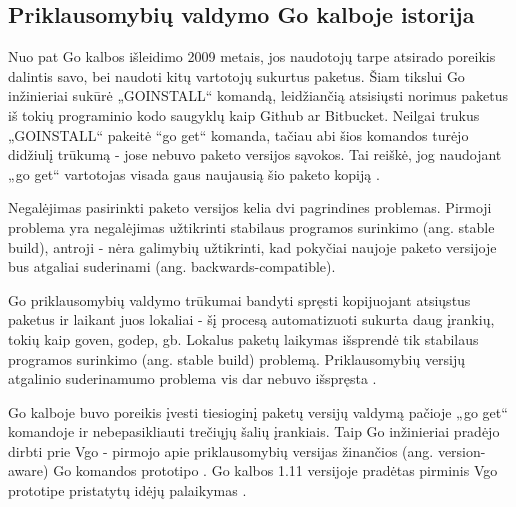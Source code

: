 \subsection{Priklausomybių valdymo Go kalboje istorija}

Nuo pat Go kalbos išleidimo 2009 metais, jos naudotojų tarpe atsirado poreikis dalintis savo, bei naudoti kitų vartotojų sukurtus paketus.
Šiam tikslui Go inžinieriai sukūrė „GOINSTALL“ komandą, leidžiančią atsisiųsti norimus paketus iš tokių programinio kodo saugyklų kaip Github ar Bitbucket.
Neilgai trukus „GOINSTALL“ pakeitė “go get“ komanda, tačiau abi šios komandos turėjo didžiulį trūkumą - jose nebuvo
paketo versijos sąvokos. Tai reiškė, jog naudojant „go get“ vartotojas visada gaus naujausią šio paketo kopiją \cite{COX18a}.

Negalėjimas pasirinkti paketo versijos kelia dvi pagrindines problemas.
Pirmoji problema yra negalėjimas užtikrinti stabilaus programos surinkimo (ang. stable build),
antroji - nėra galimybių užtikrinti, kad pokyčiai naujoje paketo versijoje bus atgaliai suderinami (ang. backwards-compatible).

Go priklausomybių valdymo trūkumai bandyti spręsti kopijuojant atsiųstus paketus ir laikant juos lokaliai -
šį procesą automatizuoti sukurta daug įrankių, tokių kaip goven, godep, gb. Lokalus paketų laikymas
išsprendė tik stabilaus programos surinkimo (ang. stable build) problemą. Priklausomybių versijų
atgalinio suderinamumo problema vis dar nebuvo išspręsta \cite{COX18a}.

Go kalboje buvo poreikis įvesti tiesioginį paketų versijų valdymą pačioje „go get“ komandoje ir nebepasikliauti trečiųjų šalių
įrankiais. Taip Go inžinieriai pradėjo dirbti prie Vgo - pirmojo apie priklausomybių versijas žinančios (ang. version-aware) Go
komandos prototipo \cite{COX18b}. Go kalbos 1.11 versijoje pradėtas pirminis Vgo prototipe pristatytų idėjų palaikymas
\cite{GOLANG19}.
